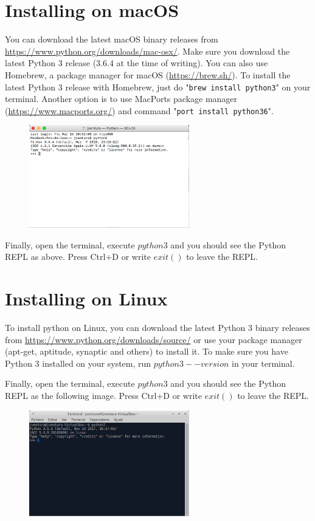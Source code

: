 \section{Installing on macOS}

You can download the latest macOS binary releases from \url{https://www.python.org/downloads/mac-osx/}. Make sure you download the latest Python 3 release (3.6.4 at the time of writing). You can also use Homebrew, a package manager for macOS (\url{https://brew.sh/}). To install the latest Python 3 release with Homebrew, just do "\texttt{brew install python3}" on your terminal. Another option is to use MacPorts package manager (\url{https://www.macports.org/}) and command "\texttt{port install python36}".  


\begin{figure}[H]
	\centering
  	\includegraphics[width=0.62\textwidth]{images/python_macos.png}
\end{figure}

Finally, open the terminal, execute $python3$ and you should see the Python REPL as above. Press Ctrl+D or write $exit()$ to leave the REPL.

\section{Installing on Linux}

To install python on Linux, you can download the latest Python 3 binary releases from \url{https://www.python.org/downloads/source/} or use your package manager (apt-get, aptitude, synaptic and others) to install it. To make sure you have Python 3 installed on your system, run $python3 --version$ in your terminal.

Finally, open the terminal, execute $python3$ and you should see the Python REPL as the following image. Press Ctrl+D or write $exit()$ to leave the REPL.

\begin{figure}[H]
	\centering
  	\includegraphics[width=0.62\textwidth]{images/python_linux.png}
\end{figure}
